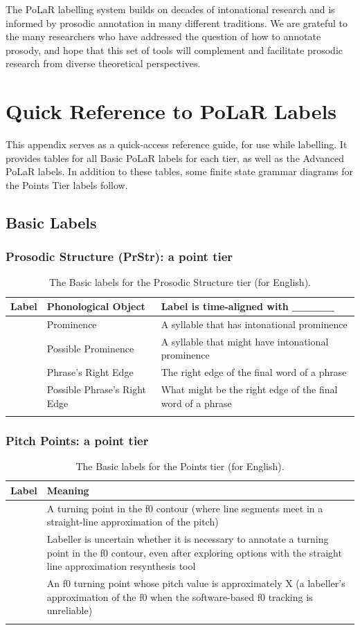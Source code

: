 \documentclass[11pt, twoside]{memoir}
\def\polar#1{{\relsize{-.5}\fontspec[Mapping=tex-text]{Roboto Mono}{#1}}}
\begin{document}
The PoLaR labelling system builds on decades of intonational research and is informed by prosodic annotation in many different traditions. We are grateful to the many researchers who have addressed the question of how to annotate prosody, and hope that this set of tools will complement and facilitate prosodic research from diverse theoretical perspectives.





\appendix
\chapter{Quick Reference to PoLaR Labels}\label{sec:polar-quick-reference-to-labels}

This appendix serves as a quick-access reference guide, for use while labelling. It provides tables for all Basic PoLaR labels for each tier, as well as the Advanced PoLaR labels. In addition to these tables, some finite state grammar diagrams for the Points Tier labels follow.


\section*{Basic Labels}

\subsection*{Prosodic Structure (PrStr): a point tier}
\begin{longtable}{clp{.525\linewidth}} \toprule \textbf{Label} & \textbf{Phonological Object} & \textbf{Label is time-aligned with \_\_\_\_\_}\tabularnewline
\midrule \endhead
\polar{*} & Prominence & A syllable that has intonational prominence \tabularnewline
\polar{?*} & Possible Prominence & A syllable that might have intonational prominence \tabularnewline
\polar{]} & Phrase’s Right Edge & The right edge of the final word of a phrase \tabularnewline
\polar{?]} & Possible Phrase’s Right Edge & What might be the right edge of the final word of a phrase \tabularnewline
\bottomrule 
\caption{The Basic labels for the Prosodic Structure tier (for English).%
}
\end{longtable}

\subsection*{Pitch Points: a point tier}
\begin{longtable}{cp{.8\linewidth}} \toprule \textbf{Label} & \textbf{Meaning} \tabularnewline
\midrule \endhead
\polar{0} & A turning point in the f0 contour (where line segments meet in a straight-line approximation of the pitch) \tabularnewline
\polar{?0} & Labeller is uncertain whether it is necessary to annotate a turning point in the f0 contour, even after exploring options with the straight line approximation resynthesis tool \tabularnewline
\polar{0,X} & An f0 turning point whose pitch value is approximately X (a labeller’s approximation of the f0 when the software-based f0 tracking is unreliable) \tabularnewline
\bottomrule 
\caption{The Basic labels for the Points tier (for English).%
}
\end{longtable}
\end{document}
